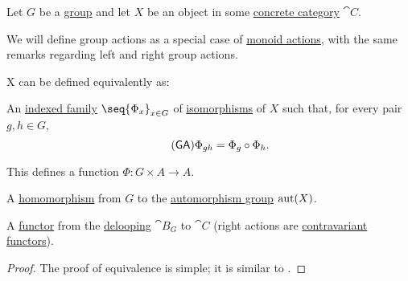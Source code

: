 \begin{definition}\label{def:group_action}
  Let \( G \) be a \hyperref[def:group]{group} and let \( X \) be an object in some \hyperref[def:concrete_category]{concrete category} \( \cat{C} \).

  We will define group actions as a special case of \hyperref[def:monoid_action]{monoid actions}, with the same remarks regarding left and right group actions.

  X  can be defined equivalently as:
  \begin{thmenum}
     An \hyperref[def:cartesian_product/indexed_family]{indexed family} \( \seq{ \Phi_x }_{x \in G} \) of \hyperref[def:morphism_invertibility/isomorphism]{isomorphisms} of \( X \) such that, for every pair \( g, h \in G \),
    \begin{equation}\label{eq:def:group_action/family/compatibility}\tag{\logic{GA}}
      \Phi_{gh} = \Phi_g \bincirc \Phi_h.
    \end{equation}

    This defines a function \( \Phi: G \times A \to A \).

     A \hyperref[def:group/homomorphism]{homomorphism} from \( G \) to the \hyperref[def:automorphism_group]{automorphism group} \( \operatorname{aut}(X) \).

     A \hyperref[def:functor]{functor} from the \hyperref[def:monoid_delooping]{delooping} \( \cat{B}_G \) to \( \cat{C} \) (right actions are \hyperref[rem:contravariant_functor]{contravariant functors}).
  \end{thmenum}
\end{definition}
\begin{proof}
  The proof of equivalence is simple; it is similar to .
\end{proof}

